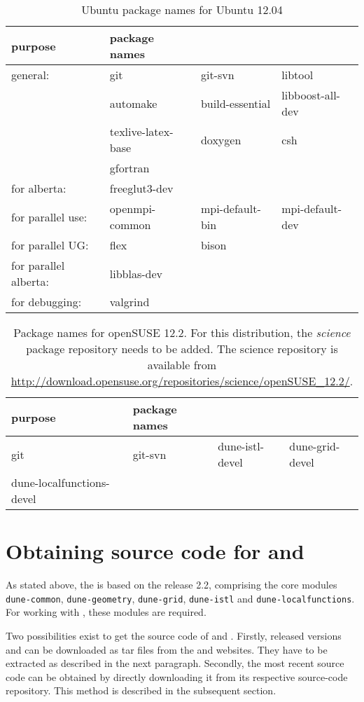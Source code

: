 \begin{table}
\centering
\caption{Ubuntu package names for Ubuntu 12.04}
\begin{tabular}{llll}
\toprule
\textbf{purpose} & \textbf{package names} \\
\midrule
general: & git & git-svn & libtool \\
& automake & build-essential & libboost-all-dev \\
& texlive-latex-base & doxygen & csh\\
& gfortran & \\
\midrule
for alberta: & freeglut3-dev &  \\
\midrule
for parallel use: & openmpi-common & mpi-default-bin & mpi-default-dev \\
\midrule
for parallel UG: & flex & bison & \\
\midrule
for parallel alberta: & libblas-dev &\\
\midrule
for debugging: & valgrind &\\
\bottomrule
\end{tabular}
\label{tbl:ubuntu-pkg}
\end{table}

\begin{table}
\centering
\caption{Package names for openSUSE 12.2. For this distribution, the {\em science} package repository needs to be added. The science repository is available from \url{http://download.opensuse.org/repositories/science/openSUSE_12.2/}. }
\begin{tabular}{llll}
\toprule
\textbf{purpose} & \textbf{package names} \\
\midrule
git & git-svn & dune-istl-devel & dune-grid-devel \\
dune-localfunctions-devel & \\
\bottomrule
\end{tabular}
\label{tbl:opensuse-pkg}
\end{table}

\section{Obtaining source code for \Dune and \eWoms}

As stated above, the \eWoms is based on the \Dune release 2.2,
comprising the core modules \texttt{dune-common},
\texttt{dune-geometry}, \texttt{dune-grid}, \texttt{dune-istl} and
\texttt{dune-localfunctions}.  For working with \eWoms, these modules
are required.

Two possibilities exist to get the source code of \Dune and \eWoms.
Firstly, released versions \Dune and \eWoms can be downloaded as tar
files from the \Dune and \eWoms websites. They have to be extracted as
described in the next paragraph.  Secondly, the most recent source
code can be obtained by directly downloading it from its respective
source-code repository. This method is described in the subsequent
section.

